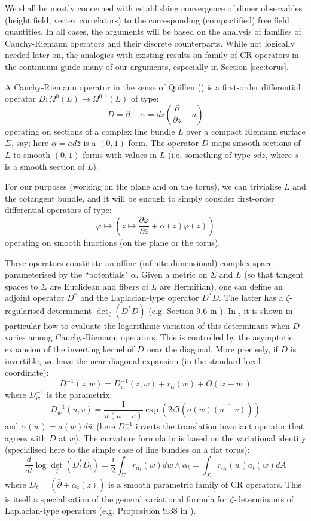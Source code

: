 \documentclass[10pt]{article}
\newcommand{\dbar}{\bar\partial}
\begin{document}
We shall be mostly concerned with establishing convergence of dimer observables (height field, vertex correlators) to the corresponding (compactified) free field quantities. In all cases, the arguments will be based on the analysis of families of Cauchy-Riemann operators and their discrete counterparts. While not logically needed later on, the analogies with existing results on family of CR operators in the continuum guide many of our arguments, especially in Section \ref{sec:torus}.

A Cauchy-Riemann operator in the sense of Quillen (\cite{Qui}) is a first-order differential operator $D:\Omega^0(L)\rightarrow\Omega^{0,1}(L)$ of type: 
$$D=\dbar+\alpha=d\bar z\left(\frac{\partial}{\partial{\bar z}}+a\right)$$ 
operating on sections of a complex line bundle $L$ over a compact Riemann surface $\Sigma$, say; here $\alpha=ad\bar z$ is a $(0,1)$-form. The operator $D$ maps smooth sections of $L$ to smooth $(0,1)$-forms with values in $L$ (i.e. something of type $sd\bar z$, where $s$ is a smooth section of $L$).

For our purposes (working on the plane and on the torus), we can trivialise $L$ and the cotangent bundle, and it will be enough to simply consider first-order differential operators of type:
$$\varphi\longmapsto\left(z\mapsto\frac{\partial\varphi}{\partial{\bar z}}+\alpha(z)\varphi(z)\right)$$ 
operating on smooth functions (on the plane or the torus).

These operators constitute an affine (infinite-dimensional) complex space parameterised by the ``potentials" $\alpha$. Given a metric on $\Sigma$ and $L$ (so that tangent spaces to $\Sigma$ are Euclidean and fibers of $L$ are Hermitian), one can define an adjoint operator $D^*$ and the Laplacian-type operator $D^*D$. The latter has a $\zeta$-regularised determinant $\det_\zeta(D^*D)$ (e.g. Section 9.6 in \cite{BGV_dirac}). In \cite{Qui}, it is shown in particular how to evaluate the logarithmic variation of this determinant when $D$ varies among Cauchy-Riemann operators. This is controlled by the asymptotic expansion of the inverting kernel of $D$ near the diagonal. More precisely, if $D$ is invertible, we have the near diagonal expansion (in the standard local coordinate):
$$D^{-1}(z,w)=D^{-1}_w(z,w)+r_\alpha(w)+O(|z-w|)$$
where $D_w^{-1}$ is the parametrix: 
$$D_w^{-1}(u,v)=\frac{1}{\pi(u-v)}\exp(2i\Im(a(w)\overline{(u-v)}))$$
and $\alpha(w)=a(w)d\bar w$ (here $D_w^{-1}$ inverts the translation invariant operator that agrees with $D$ at $w$). The curvature formula in \cite{Qui} is based on the variational identity (specialised here to the simple case of line bundles on a flat torus):
\begin{equation}\label{eq:Quillenvar}
\frac {d}{dt}\log{\det}_\zeta(D^*_tD_t)=\frac i2\int_\Sigma  r_{\alpha_t}(w)dw\wedge\dot \alpha_t=\int_\Sigma r_{\alpha_t}(w)\dot a_t(w)dA
\end{equation}
where $D_t=(\dbar+\alpha_t(z))$ is a smooth parametric family of CR operators. This is itself a specialisation of the general variational formula for $\zeta$-determinants of Laplacian-type operators (e.g. Proposition 9.38 in \cite{BGV_dirac}).
\end{document}

